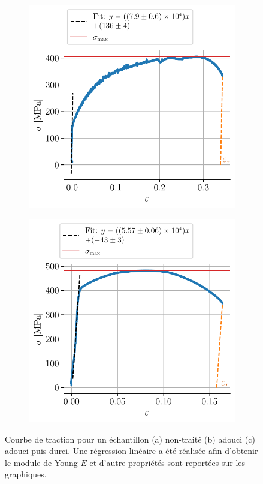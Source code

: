 \begin{figure}[H]
\begin{subfigure}{0.48\linewidth}
        \includegraphics[width=\linewidth]{figures/chaud3_annotated.pdf}
        \caption{}
        \label{fig:chaud3}
    \end{subfigure}
    \begin{subfigure}{0.48\linewidth}
        \centering
        \includegraphics[width=\linewidth]{figures/tiede6_annotated.pdf}
        \caption{}
        \label{fig:tiede6}
    \end{subfigure}
    \caption{Courbe de traction pour un échantillon (a) non-traité (b) adouci (c) adouci puis durci. Une régression linéaire a été réalisée afin d'obtenir le module de Young \(E\) et d'autre propriétés sont reportées sur les graphiques.}
    \label{fig:tractions_exp}
\end{figure}

